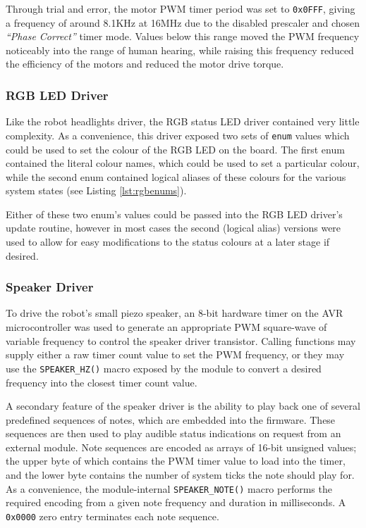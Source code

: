 Through trial and error, the motor PWM timer period was set to \lstinline{0x0FFF}, giving a frequency of around 8.1KHz at 16MHz due to the disabled prescaler and chosen \textit{``Phase Correct''} timer mode. Values below this range moved the PWM frequency noticeably into the range of human hearing, while raising this frequency reduced the efficiency of the motors and reduced the motor drive torque.

\FloatBarrier
\subsubsection{RGB LED Driver}

Like the robot headlights driver, the RGB status LED driver contained very little complexity. As a convenience, this driver exposed two sets of \lstinline{enum} values which could be used to set the colour of the RGB LED on the board. The first enum contained the literal colour names, which could be used to set a particular colour, while the second enum contained logical aliases of these colours for the various system states (see Listing \ref{lst:rgbenums}).



Either of these two enum's values could be passed into the RGB LED driver's update routine, however in most cases the second (logical alias) versions were used to allow for easy modifications to the status colours at a later stage if desired.

\FloatBarrier
\subsubsection{Speaker Driver}

To drive the robot's small piezo speaker, an 8-bit hardware timer on the AVR microcontroller was used to generate an appropriate PWM square-wave of variable frequency to control the speaker driver transistor. Calling functions may supply either a raw timer count value to set the PWM frequency, or they may use the \lstinline{SPEAKER_HZ()} macro exposed by the module to convert a desired frequency into the closest timer count value.

A secondary feature of the speaker driver is the ability to play back one of several predefined sequences of notes, which are embedded into the firmware. These sequences are then used to play audible status indications on request from an external module. Note sequences are encoded as arrays of 16-bit unsigned values; the upper byte of which contains the PWM timer value to load into the timer, and the lower byte contains the number of system ticks the note should play for. As a convenience, the module-internal \lstinline{SPEAKER_NOTE()} macro performs the required encoding from a given note frequency and duration in milliseconds. A \lstinline{0x0000} zero entry terminates each note sequence.

